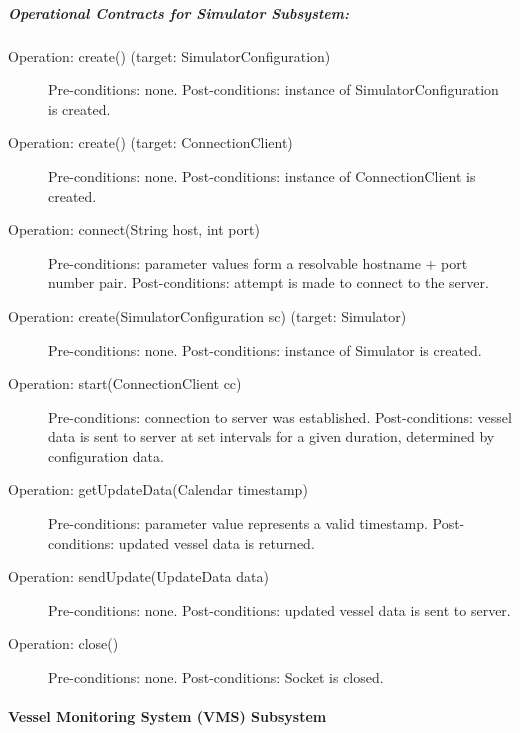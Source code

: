 \documentclass{article}
\begin{document}
\subparagraph{Operational Contracts for Simulator Subsystem:}

\begin{description}
  \item[Operation: create() (target: SimulatorConfiguration)] Pre-conditions: none.\newline
  Post-conditions: instance of SimulatorConfiguration is created.
  \item[Operation: create() (target: ConnectionClient)] Pre-conditions: none.\newline
  Post-conditions: instance of ConnectionClient is created.
  \item[Operation: connect(String host, int port)] Pre-conditions: parameter values form a resolvable hostname + port number pair.\newline
  Post-conditions: attempt is made to connect to the server.
  \item[Operation: create(SimulatorConfiguration sc) (target: Simulator)] Pre-conditions: none.\newline
  Post-conditions: instance of Simulator is created.
  \item[Operation: start(ConnectionClient cc)] Pre-conditions: connection to server was established.\newline
  Post-conditions: vessel data is sent to server at set intervals for a given duration, determined by configuration data.
  \item[Operation: getUpdateData(Calendar timestamp)] Pre-conditions: parameter value represents a valid timestamp.\newline
  Post-conditions: updated vessel data is returned.
  \item[Operation: sendUpdate(UpdateData data)] Pre-conditions: none.\newline
  Post-conditions: updated vessel data is sent to server.
  \item[Operation: close()] Pre-conditions: none.\newline
  Post-conditions: Socket is closed.
\end{description}

\break
\paragraph{Vessel Monitoring System (VMS) Subsystem}
\end{document}
